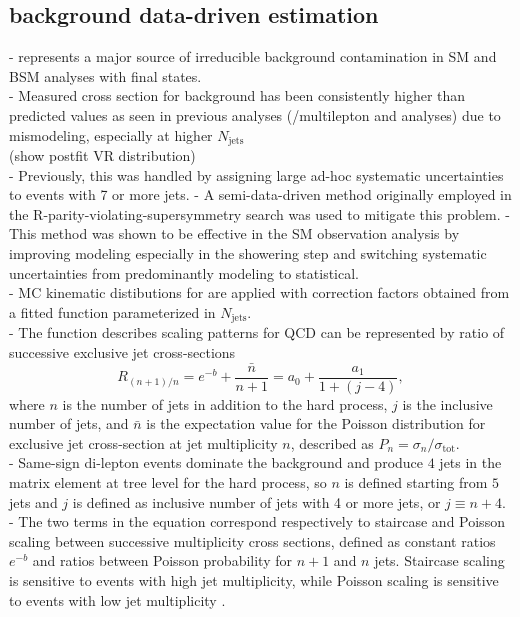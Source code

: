 \documentclass[../thesis.tex]{subfiles}
\begin{document}
\subsection{\ttW background data-driven estimation}
- \ttW represents a major source of irreducible background contamination in SM and BSM analyses with \tttt final states.\\
- Measured cross section for \ttW background has been consistently higher than predicted values as seen in previous analyses (\ttH/\ttW multilepton \citep{bg:ttH_ttW_ML,ana:ttW_meas} and \tttt \citep{tttt_evidence,tttt_obs} analyses) due to mismodeling, especially at higher $N_\mathrm{jets}$ \\
(show postfit \ttW VR distribution)\\
- Previously, this was handled by assigning large ad-hoc systematic uncertainties to \ttW events with 7 or more jets. 
- A semi-data-driven method originally employed in the R-parity-violating-supersymmetry search \citep{ana:r_par_susy_2021} was used to mitigate this problem. 
- This method was shown to be effective in the SM \tttt observation analysis \citep{tttt_obs} by improving \ttW modeling especially in the showering step and switching \ttW systematic uncertainties from predominantly modeling to statistical.\\
- MC kinematic distibutions for \ttW are applied with correction factors obtained from a fitted function parameterized in $N_\mathrm{jets}$.\\
- The function describes scaling patterns for QCD \citep{bg:qcd_scaling} can be represented by ratio of successive exclusive jet cross-sections
\begin{equation}
R_{(n+1)/n} = e^{-b} + \frac{\bar{n}}{n+1} = a_0 + \frac{a_1}{1+(j-4)},
\end{equation}
where $n$ is the number of jets in addition to the hard process, $j$ is the inclusive number of jets, and $\bar{n}$ is the expectation value for the Poisson distribution for exclusive jet cross-section at jet multiplicity $n$, described as $P_n=\sigma_n/\sigma_\mathrm{tot}$.\\
- Same-sign di-lepton \ttW events dominate the \ttW background and produce $4$ jets in the matrix element at tree level for the hard process, so $n$ is defined starting from $5$ jets and $j$ is defined as inclusive number of jets with 4 or more jets, or $j\equiv n+4$.\\
- The two terms in the equation correspond respectively to staircase and Poisson scaling between successive multiplicity cross sections, defined as constant ratios $e^{-b}$ and ratios between Poisson probability for $n+1$ and $n$ jets. Staircase scaling is sensitive to events with high jet multiplicity, while Poisson scaling is sensitive to events with low jet multiplicity \citep{bg:qcd_scaling}.\\
\end{document}
